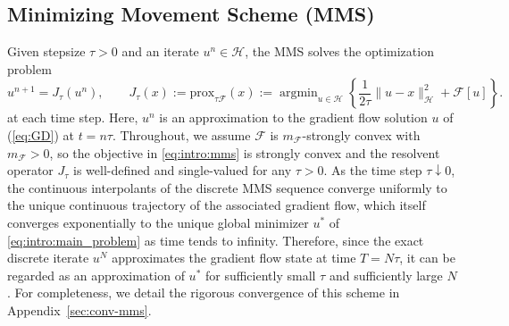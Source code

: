 \documentclass[twoside,11pt]{article}
\newcommand{\prox}{\mathrm{prox}}
\newcommand{\argmin}{\mathop{\mathrm{arg min}}}
\newcommand{\calF}{\mathcal{F}}
\newcommand{\calH}{\mathcal{H}}
\begin{document}
\subsection{Minimizing Movement Scheme (MMS)}
Given stepsize $\tau>0$ and an iterate $u^n\in \calH$, the MMS solves the optimization problem
\begin{equation}\label{eq:intro:mms}
u^{n+1} = J_\tau(u^n),
\qquad
J_\tau(x):=\prox_{\tau \calF}(x):=\argmin_{u\in \calH}\left\{\frac{1}{2\tau}\|u-x\|_\calH^2 + \calF[u]\right\}.
\end{equation}
at each time step. Here, $u^n$ is an approximation to the gradient flow solution $u$ of (\ref{eq:GD}) at $t = n \tau$.
Throughout, we assume $\calF$ is $m_\calF$-strongly convex with $m_\calF>0$, so the objective in \eqref{eq:intro:mms} is strongly convex and the resolvent operator $J_\tau$ is well-defined and single-valued for any $\tau>0$. As the time step $\tau\downarrow 0$, the continuous interpolants of the discrete MMS sequence converge uniformly to the unique continuous trajectory of the associated gradient flow, which itself converges exponentially to the unique global minimizer $u^*$ of \eqref{eq:intro:main_problem} as time tends to infinity.
Therefore, since the exact discrete iterate $u^N$ approximates the gradient flow state at time $T=N\tau$, it can be regarded as an approximation of $u^*$ for sufficiently small $\tau$ and sufficiently large $N$.
For completeness, we detail the rigorous convergence of this scheme in Appendix~\ref{sec:conv-mms}.

\end{document}
